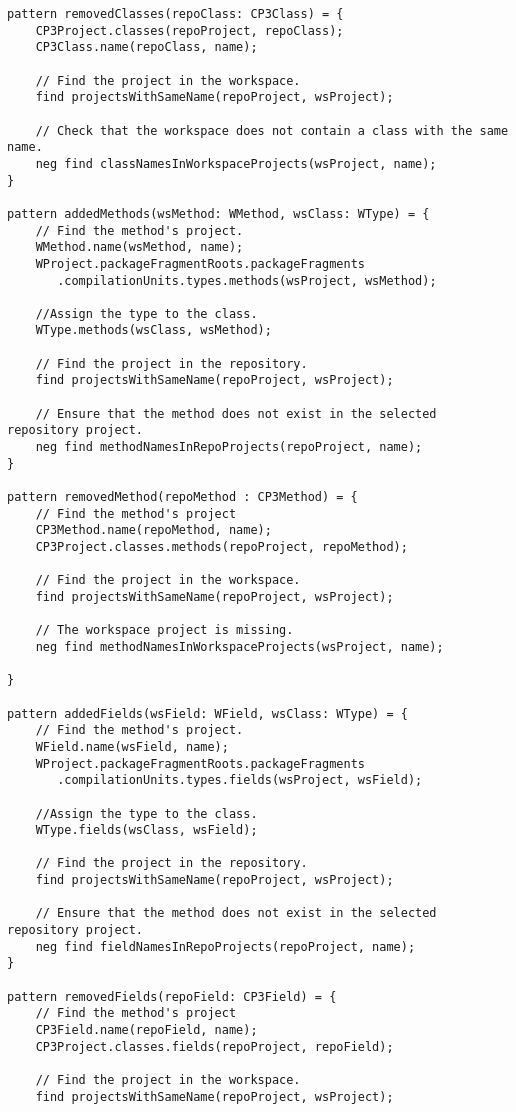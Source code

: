 \begin{lstlisting}
pattern removedClasses(repoClass: CP3Class) = {
	CP3Project.classes(repoProject, repoClass);
	CP3Class.name(repoClass, name);

	// Find the project in the workspace.
	find projectsWithSameName(repoProject, wsProject);

	// Check that the workspace does not contain a class with the same name.
	neg find classNamesInWorkspaceProjects(wsProject, name);
}

pattern addedMethods(wsMethod: WMethod, wsClass: WType) = {
	// Find the method's project.
	WMethod.name(wsMethod, name);
	WProject.packageFragmentRoots.packageFragments
	   .compilationUnits.types.methods(wsProject, wsMethod);

	//Assign the type to the class.
	WType.methods(wsClass, wsMethod);

	// Find the project in the repository.
	find projectsWithSameName(repoProject, wsProject);

	// Ensure that the method does not exist in the selected repository project.
	neg find methodNamesInRepoProjects(repoProject, name);
}

pattern removedMethod(repoMethod : CP3Method) = {
	// Find the method's project
	CP3Method.name(repoMethod, name);
	CP3Project.classes.methods(repoProject, repoMethod);

	// Find the project in the workspace.
	find projectsWithSameName(repoProject, wsProject);

	// The workspace project is missing.
	neg find methodNamesInWorkspaceProjects(wsProject, name);

}

pattern addedFields(wsField: WField, wsClass: WType) = {
	// Find the method's project.
	WField.name(wsField, name);
	WProject.packageFragmentRoots.packageFragments
	   .compilationUnits.types.fields(wsProject, wsField);

	//Assign the type to the class.
	WType.fields(wsClass, wsField);

	// Find the project in the repository.
	find projectsWithSameName(repoProject, wsProject);

	// Ensure that the method does not exist in the selected repository project.
	neg find fieldNamesInRepoProjects(repoProject, name);
}

pattern removedFields(repoField: CP3Field) = {
	// Find the method's project
	CP3Field.name(repoField, name);
	CP3Project.classes.fields(repoProject, repoField);

	// Find the project in the workspace.
	find projectsWithSameName(repoProject, wsProject);


\end{lstlisting}
